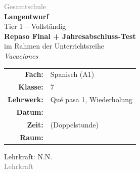 \documentclass[11pt,a4paper]{article}
\newcommand{\fach}{Spanisch}
\newcommand{\jahrgangsstufe}{7}
\newcommand{\schulart}{Gesamtschule}
\newcommand{\stundenthema}{Repaso Final + Jahresabschluss-Test}
\newcommand{\reihenthema}{Vacaciones}
\newcommand{\lehrkraft}{N.N.}
\newcommand{\ausbildungsstand}{Lehrkraft}
\newcommand{\gerniveau}{A1}
\newcommand{\lehrwerk}{Qué pasa 1}
\newcommand{\lehrwerkseite}{Wiederholung}
\begin{document}
\begin{titlepage}
    \centering
    \vspace*{2cm}

    {\large\textcolor{gray}{\schulart}}\\[2cm]

    {\Huge\textcolor{fach}{\textbf{Langentwurf}}}\\[0.5cm]
    {\large Tier 1 -- Vollständig}\\[2cm]

    {\LARGE\textbf{\stundenthema}}\\[0.5cm]
    {\large im Rahmen der Unterrichtsreihe}\\[0.3cm]
    {\Large\textit{\reihenthema}}\\[2cm]

    \begin{tabular}{rl}
        \textbf{Fach:} & \fach{} (\gerniveau) \\[0.3cm]
        \textbf{Klasse:} & \jahrgangsstufe \\[0.3cm]
        \textbf{Lehrwerk:} & \lehrwerk, \lehrwerkseite \\[0.3cm]
        \textbf{Datum:} & \underline{\hspace{3cm}} \\[0.3cm]
        \textbf{Zeit:} & \underline{\hspace{3cm}} (Doppelstunde) \\[0.3cm]
        \textbf{Raum:} & \underline{\hspace{3cm}} \\[0.3cm]
    \end{tabular}

    \vfill

    {\large Lehrkraft: \lehrkraft}\\[0.3cm]
    {\normalsize\textcolor{gray}{\ausbildungsstand}}\\[1cm]

\end{titlepage}

\tableofcontents
\newpage

\end{document}

